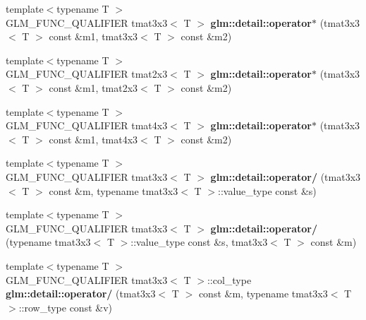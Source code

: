 \begin{DoxyCompactItemize}
\item 
\hypertarget{namespaceglm_1_1detail_a760b11487e92287a195d540c867c286a}{}{\footnotesize template$<$typename T $>$ }\\G\+L\+M\+\_\+\+F\+U\+N\+C\+\_\+\+Q\+U\+A\+L\+I\+F\+I\+E\+R tmat3x3$<$ T $>$ {\bfseries glm\+::detail\+::operator$\ast$} (tmat3x3$<$ T $>$ const \&m1, tmat3x3$<$ T $>$ const \&m2)\label{namespaceglm_1_1detail_a760b11487e92287a195d540c867c286a}

\item 
\hypertarget{namespaceglm_1_1detail_a30b3fdb9ba1e8a29bd5fe3d0e3ecfd38}{}{\footnotesize template$<$typename T $>$ }\\G\+L\+M\+\_\+\+F\+U\+N\+C\+\_\+\+Q\+U\+A\+L\+I\+F\+I\+E\+R tmat2x3$<$ T $>$ {\bfseries glm\+::detail\+::operator$\ast$} (tmat3x3$<$ T $>$ const \&m1, tmat2x3$<$ T $>$ const \&m2)\label{namespaceglm_1_1detail_a30b3fdb9ba1e8a29bd5fe3d0e3ecfd38}

\item 
\hypertarget{namespaceglm_1_1detail_a041563813c0c18989cfc4fd64f69cff1}{}{\footnotesize template$<$typename T $>$ }\\G\+L\+M\+\_\+\+F\+U\+N\+C\+\_\+\+Q\+U\+A\+L\+I\+F\+I\+E\+R tmat4x3$<$ T $>$ {\bfseries glm\+::detail\+::operator$\ast$} (tmat3x3$<$ T $>$ const \&m1, tmat4x3$<$ T $>$ const \&m2)\label{namespaceglm_1_1detail_a041563813c0c18989cfc4fd64f69cff1}

\item 
\hypertarget{namespaceglm_1_1detail_ab4c968d521892c340f090b598160d005}{}{\footnotesize template$<$typename T $>$ }\\G\+L\+M\+\_\+\+F\+U\+N\+C\+\_\+\+Q\+U\+A\+L\+I\+F\+I\+E\+R tmat3x3$<$ T $>$ {\bfseries glm\+::detail\+::operator/} (tmat3x3$<$ T $>$ const \&m, typename tmat3x3$<$ T $>$\+::value\+\_\+type const \&s)\label{namespaceglm_1_1detail_ab4c968d521892c340f090b598160d005}

\item 
\hypertarget{namespaceglm_1_1detail_a9f064c716ea2ae07f2c95d0b25809ad7}{}{\footnotesize template$<$typename T $>$ }\\G\+L\+M\+\_\+\+F\+U\+N\+C\+\_\+\+Q\+U\+A\+L\+I\+F\+I\+E\+R tmat3x3$<$ T $>$ {\bfseries glm\+::detail\+::operator/} (typename tmat3x3$<$ T $>$\+::value\+\_\+type const \&s, tmat3x3$<$ T $>$ const \&m)\label{namespaceglm_1_1detail_a9f064c716ea2ae07f2c95d0b25809ad7}

\item 
\hypertarget{namespaceglm_1_1detail_ac5bacf2063ce5a377650afe09360cec0}{}{\footnotesize template$<$typename T $>$ }\\G\+L\+M\+\_\+\+F\+U\+N\+C\+\_\+\+Q\+U\+A\+L\+I\+F\+I\+E\+R tmat3x3$<$ T $>$\+::col\+\_\+type {\bfseries glm\+::detail\+::operator/} (tmat3x3$<$ T $>$ const \&m, typename tmat3x3$<$ T $>$\+::row\+\_\+type const \&v)\label{namespaceglm_1_1detail_ac5bacf2063ce5a377650afe09360cec0}


\end{DoxyCompactItemize}
